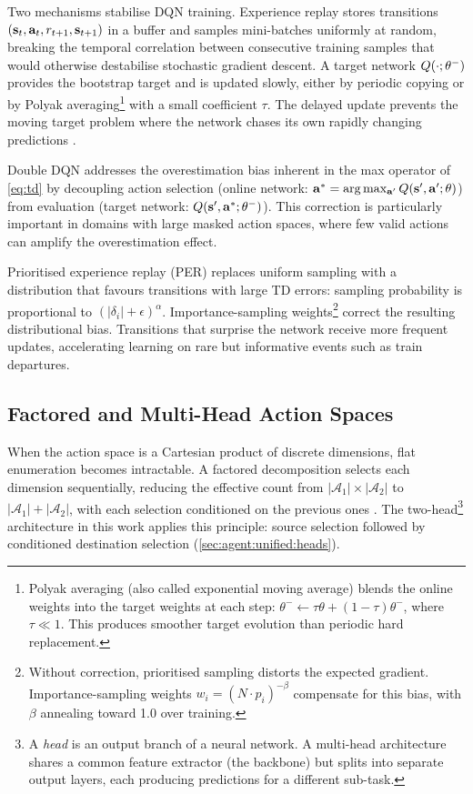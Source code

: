 Two mechanisms stabilise DQN training. Experience replay \cite{lin1992} stores transitions $(\mathbf{s}_t, \mathbf{a}_t, r_{t+1}, \mathbf{s}_{t+1})$ in a buffer and samples mini-batches uniformly at random, breaking the temporal correlation between consecutive training samples that would otherwise destabilise stochastic gradient descent. A target network $Q(\cdot; \theta^-)$ provides the bootstrap target and is updated slowly, either by periodic copying or by Polyak averaging\footnote{Polyak averaging (also called exponential moving average) blends the online weights into the target weights at each step: $\theta^- \leftarrow \tau \theta + (1 - \tau) \theta^-$, where $\tau \ll 1$. This produces smoother target evolution than periodic hard replacement.} with a small coefficient $\tau$. The delayed update prevents the moving target problem where the network chases its own rapidly changing predictions \cite{mnih2015dqn}.

Double DQN \cite{hasselt2016ddqn} addresses the overestimation bias inherent in the max operator of \cref{eq:td} by decoupling action selection (online network: $\mathbf{a}^* = \arg\max_{\mathbf{a}'} Q(\mathbf{s}', \mathbf{a}'; \theta)$) from evaluation (target network: $Q(\mathbf{s}', \mathbf{a}^*; \theta^-)$). This correction is particularly important in domains with large masked action spaces, where few valid actions can amplify the overestimation effect.

Prioritised experience replay (PER) \cite{schaul2016per} replaces uniform sampling with a distribution that favours transitions with large TD errors: sampling probability is proportional to $(|\delta_i| + \epsilon)^\alpha$. Importance-sampling weights\footnote{Without correction, prioritised sampling distorts the expected gradient. Importance-sampling weights $w_i = (N \cdot p_i)^{-\beta}$ compensate for this bias, with $\beta$ annealing toward 1.0 over training.} correct the resulting distributional bias. Transitions that surprise the network receive more frequent updates, accelerating learning on rare but informative events such as train departures.

\subsection{Factored and Multi-Head Action Spaces}
\label{sec:bg:rl:factored}

When the action space is a Cartesian product of discrete dimensions, flat enumeration becomes intractable. A factored decomposition selects each dimension sequentially, reducing the effective count from $|\mathcal{A}_1| \times |\mathcal{A}_2|$ to $|\mathcal{A}_1| + |\mathcal{A}_2|$, with each selection conditioned on the previous ones \cite{suttonbarto2018}. The two-head\footnote{A \emph{head} is an output branch of a neural network. A multi-head architecture shares a common feature extractor (the backbone) but splits into separate output layers, each producing predictions for a different sub-task.} architecture in this work applies this principle: source selection followed by conditioned destination selection (\cref{sec:agent:unified:heads}).

